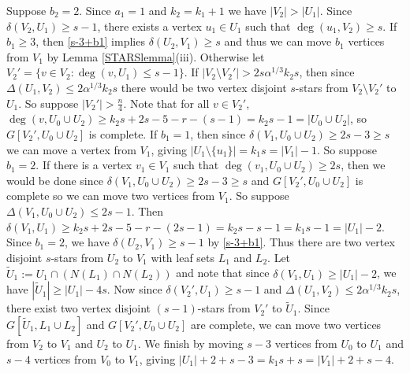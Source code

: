 \documentclass[oneside,12pt]{memoir}
\begin{document}
Suppose $b_2=2$.  Since $a_1=1$ and $k_2=k_1+1$ we have $|V_2|>|U_1|$.  Since $\delta(V_2, U_1)\geq s-1$, there exists a vertex $u_1\in U_1$ such that $\deg(u_1, V_2)\geq s$.  If $b_1\geq 3$, then \eqref{s-3+b1} implies $\delta(U_2, V_1)\geq s$ and thus we can move $b_1$ vertices from $V_1$ by Lemma \ref{STARSlemma}(iii).  Otherwise let $V_2'=\{v\in V_2:\deg(v, U_1)\leq s-1\}$.  If $|V_2\setminus V_2'|>2s\alpha^{1/3}k_2s$, then since $\Delta(U_1, V_2)\leq 2\alpha^{1/3}k_2s$ there would be two vertex disjoint $s$-stars from $V_2\setminus V_2'$ to $U_1$.  So suppose $|V_2'|> \frac{n}{4}$.  Note that for all $v\in V_2'$, $\deg(v, U_0\cup U_2)\geq k_2s+2s-5-r-(s-1)=k_2s-1=|U_0\cup U_2|$, so $G[V_2', U_0\cup U_2]$ is complete. If $b_1=1$, then since $\delta(V_1, U_0\cup U_2)\geq 2s-3\geq s$ we can move a vertex from $V_1$, giving $|U_1\setminus\{u_1\}|=k_1s=|V_1|-1$.  So suppose $b_1=2$.  If there is a vertex $v_1\in V_1$ such that $\deg(v_1, U_0\cup U_2)\geq 2s$, then we would be done since $\delta(V_1, U_0\cup U_2)\geq 2s-3\geq s$ and $G[V_2', U_0\cup U_2]$ is complete so we can move two vertices from $V_1$.  So suppose $\Delta(V_1, U_0\cup U_2)\leq 2s-1$.  Then $\delta(V_1, U_1)\geq k_2s+2s-5-r-(2s-1)=k_2s-s-1=k_1s-1=|U_1|-2$.  Since $b_1=2$, we have $\delta(U_2, V_1)\geq s-1$ by \eqref{s-3+b1}.  Thus there are two vertex disjoint $s$-stars from $U_2$ to $V_1$ with leaf sets $L_1$ and $L_2$.  Let $\tilde{U}_1:=U_1\cap (N(L_1)\cap N(L_2))$ and note that since $\delta(V_1, U_1)\geq |U_1|-2$, we have $|\tilde{U}_1|\geq |U_1|-4s$.  Now since $\delta(V_2', U_1)\geq s-1$ and $\Delta(U_1, V_2)\leq 2\alpha^{1/3}k_2s$, there exist two vertex disjoint $(s-1)$-stars from $V_2'$ to $\tilde{U}_1$.  Since $G[\tilde{U}_1, L_1\cup L_2]$ and $G[V_2', U_0\cup U_2]$ are complete, we can move two vertices from $V_2$ to $V_1$ and $U_2$ to $U_1$.  We finish by moving $s-3$ vertices from $U_0$ to $U_1$ and $s-4$ vertices from $V_0$ to $V_1$, giving $|U_1|+2+s-3=k_1s+s=|V_1|+2+s-4$. 


% 
\end{document}
